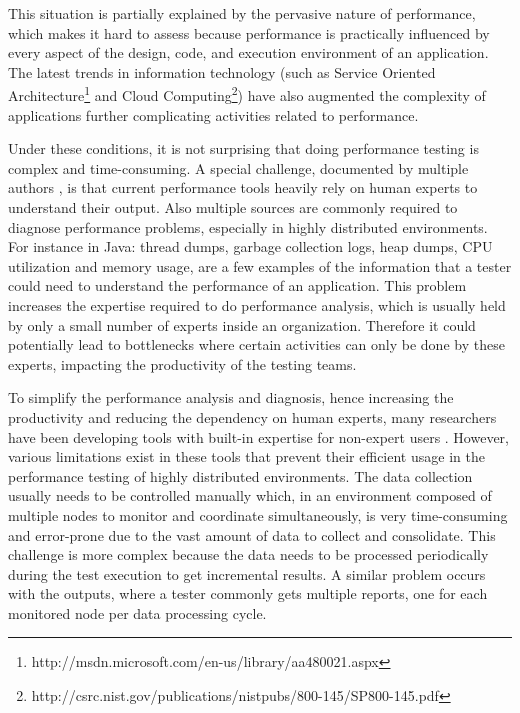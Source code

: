 \documentclass[runningheads,a4paper]{llncs}
\begin{document}
This situation is partially explained by the pervasive nature of
performance, which makes it hard to assess because performance is practically
influenced by every aspect of the design, code, and execution environment
of an application. The latest trends in information technology (such
as Service Oriented
Architecture\footnote{http://msdn.microsoft.com/en-us/library/aa480021.aspx} and 
Cloud Computing\footnote{http://csrc.nist.gov/publications/nistpubs/800-145/SP800-145.pdf}) 
have also augmented the complexity of applications further complicating activities related to
performance. 

Under these conditions, it is not surprising that doing performance
testing is complex and time-consuming. A special challenge, documented by
multiple authors \cite{Woodside2007,trevor1,Angelopoulos2012}, is that current
performance tools heavily rely on human experts to understand their
output. Also multiple sources are commonly required to diagnose performance
problems, especially in highly distributed environments. For instance in Java: thread dumps, 
garbage collection logs, heap dumps, CPU utilization and memory usage, are a few
examples of the information that a tester could need to understand the performance 
of an application. This problem increases the expertise required to do
performance analysis, which is usually held by only a small number of experts 
inside an organization\cite{Spear2009}. Therefore it could potentially lead to
bottlenecks where certain activities can only be done by these experts,
impacting the productivity of the testing teams\cite{Angelopoulos2012}.

To simplify the performance analysis and diagnosis, hence increasing the
productivity and reducing the dependency on human experts, many researchers
have been developing tools with built-in expertise for non-expert
users \cite{Altman2010,pat7,Angelopoulos2012}. However, various limitations
exist in these tools that prevent their efficient usage in the performance
testing of highly distributed environments. The data collection usually needs
to be controlled manually which, in an environment composed of multiple nodes to
monitor and coordinate simultaneously, is very time-consuming and error-prone
due to the vast amount of data to collect and consolidate. This challenge is
more complex because the data needs to be processed periodically during the
test execution to get incremental results. A similar problem occurs 
with the outputs, where a tester commonly gets multiple
reports, one for each monitored node per data processing cycle. 
\end{document}
